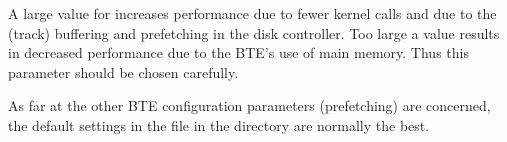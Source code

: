 A large value for 
increases performance due to fewer kernel calls and due to
the (track) buffering and prefetching in the disk
controller. Too large a value results in decreased
performance due to the BTE's use of main memory. Thus this
parameter should be chosen carefully.


As far at the other BTE configuration parameters (prefetching)
are concerned, the default settings in the  file in the
 directory are normally the best.


